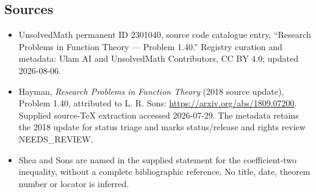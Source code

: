 \documentclass[11pt]{article}
\begin{document}
\subsection{Sources}
\begin{itemize}
\item UnsolvedMath permanent ID 2301040, source code catalogue entry, ``Research Problems in Function Theory --- Problem 1.40.'' Registry curation and metadata: Ulam AI and UnsolvedMath Contributors, CC BY 4.0; updated 2026-08-06.
\item Hayman, \emph{Research Problems in Function Theory} (2018 source update), Problem 1.40, attributed to L. R. Sons: \url{https://arxiv.org/abs/1809.07200}. Supplied source-TeX extraction accessed 2026-07-29. The metadata retains the 2018 update for status triage and marks status/release and rights review NEEDS\_REVIEW.
\item Shea and Sons are named in the supplied statement for the coefficient-two inequality, without a complete bibliographic reference. No title, date, theorem number or locator is inferred.
\end{itemize}
\end{document}

